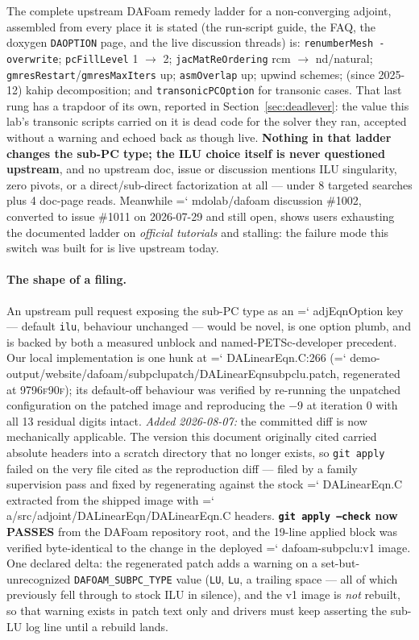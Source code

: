 \documentclass[11pt,a4paper]{article}
\newcommand{\artifact}[1]{{\small\ttfamily\hyphenchar\font=`\-\relax
  \def\_{\textunderscore\allowbreak}#1}}
\newcommand{\commit}[1]{\textsc{\small #1}}
\begin{document}
The complete upstream DAFoam remedy ladder for a non-converging adjoint, assembled from every
place it is stated (the run-script guide, the FAQ, the doxygen \texttt{DAOPTION} page, and the
live discussion threads) is: \texttt{renumberMesh -overwrite}; \texttt{pcFillLevel} 1
\(\rightarrow\) 2; \texttt{jacMatReOrdering} rcm \(\rightarrow\) nd/natural;
\texttt{gmresRestart}/\texttt{gmresMaxIters} up; \texttt{asmOverlap} up; upwind schemes;
(since 2025-12) kahip decomposition; and \texttt{transonicPCOption} for transonic cases.
That last rung has a trapdoor of its own, reported in Section~\ref{sec:deadlever}: the value
this lab's transonic scripts carried on it is dead code for the solver they ran, accepted
without a warning and echoed back as though live.
\textbf{Nothing in that ladder changes the sub-PC type; the ILU choice itself is never
questioned upstream}, and no upstream doc, issue or discussion mentions ILU singularity, zero
pivots, or a direct/sub-direct factorization at all --- under 8 targeted searches plus 4
doc-page reads. Meanwhile \artifact{mdolab/dafoam} discussion \#1002, converted to issue
\#1011 on 2026-07-29 and still open, shows users exhausting the documented ladder on
\emph{official tutorials} and stalling: the failure mode this switch was built for is live
upstream today.

\paragraph{The shape of a filing.} An upstream pull request exposing the sub-PC type as an
\artifact{adjEqnOption} key --- default \texttt{ilu}, behaviour unchanged --- would be novel,
is one option plumb, and is backed by both a measured unblock and named-PETSc-developer
precedent. Our local implementation is one hunk at \artifact{DALinearEqn.C:266}
(\artifact{demo-output/website/dafoam/subpclu\_patch/DALinearEqn\_subpclu.patch},
regenerated at \commit{9796f90f}); its default-off behaviour was verified by re-running the
unpatched configuration on the patched image and reproducing the \(-9\) at iteration 0 with
all 13 residual digits intact. \emph{Added 2026-08-07:} the committed diff is now
mechanically applicable. The version this document originally cited carried absolute headers
into a scratch directory that no longer exists, so \texttt{git apply} failed on the very file
cited as the reproduction diff --- filed by a family supervision pass and fixed by
regenerating against the stock \artifact{DALinearEqn.C} extracted from the shipped image with
\artifact{a/src/adjoint/\allowbreak DALinearEqn/DALinearEqn.C} headers.
\textbf{\texttt{git apply --check} now PASSES} from the DAFoam repository root, and the
19-line applied block was verified byte-identical to the change in the deployed
\artifact{dafoam-subpclu:v1} image. One declared delta: the regenerated patch adds a warning
on a set-but-unrecognized \texttt{DAFOAM\_SUBPC\_TYPE} value (\texttt{LU}, \texttt{Lu}, a
trailing space --- all of which previously fell through to stock ILU in silence), and the v1
image is \emph{not} rebuilt, so that warning exists in patch text only and drivers must keep
asserting the sub-LU log line until a rebuild lands.
\end{document}
